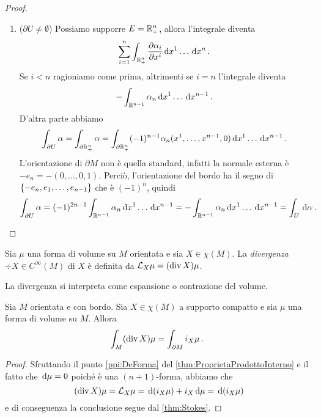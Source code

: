 \begin{proof}
\begin{enumerate}
		\item ($\partial U \not = \emptyset$) Possiamo supporre $E=\R^n_+$, allora l'integrale diventa
		\begin{equation*}
			\sum_{i=1}^n \int_{\R^n_+} \DerParz{\alpha_i}{x^i} \seqa {\de x}{n}{} \punto
		\end{equation*}
		Se $i<n$ ragioniamo come prima, altrimenti se $i=n$ l'integrale diventa
		\begin{equation*}
			- \int_{\R^{n-1}} \alpha_n \seqa {\de x}{n-1}{} \punto
		\end{equation*}
		D'altra parte abbiamo
		\begin{equation*}
			\int_{\partial U}\alpha = \int_{\partial \R^n_+} \alpha = \int_{\partial \R^n_+} (-1)^{n-1} \alpha_n(\seqa x{n-1}, ,0) \seqa {\de x}{n-1}{} \punto
		\end{equation*}
		L'orientazione di $\partial M$ non è quella standard, infatti la normale esterna è $-e_n = -(0,\ldots,0,1)$. Perciò, l'orientazione del bordo ha il segno di $\{-e_n, \seqb e{n-1},\}$ che è  $(-1)^n$, quindi
		\begin{equation*}
			\int_{\partial U}\alpha = (-1)^{2n-1} \int_{\R^{n-1}} \alpha_n \seqa{\de x}{n-1}{} = - \int_{\R^{n-1}} \alpha_n \seqa {\de x}{n-1}{} = \int_U\de \alpha \punto
		\end{equation*}


	\end{enumerate}


\end{proof}


\begin{definition} 
	Sia $\mu$ una forma di volume su $M$ orientata e sia $X\in \chi(M)$. La \emph{divergenza} $\div X \in C^\infty(M)$ di $X$ è definita da $\Lie_X\mu = (\div X)\mu$.
\end{definition}

La divergenza si interpreta come espansione o contrazione del volume.

\begin{theorem} [Gauss]\label{thm:Gauss} 
	Sia $M$ orientata e con bordo. Sia $X\in\chi(M)$ a supporto compatto e sia $\mu$ una forma di volume su $M$. Allora
	\begin{equation*}
		\int_M (\div X) \mu = \int_{\partial M} i_X \mu \punto
	\end{equation*}
\end{theorem}
\begin{proof}
	Sfruttando il punto \ref{ppi:DeForma} del \cref{thm:ProprietaProdottoInterno} e il fatto che $\de \mu =0$ poiché è una $(n+1)$-forma, abbiamo che
	\begin{equation*}
		(\div X) \mu = \Lie_X \mu = \de (i_X \mu) + i_X \de \mu = \de (i_X \mu)
	\end{equation*}
	e di conseguenza la conclusione segue dal \cref{thm:Stokes}.
\end{proof}


